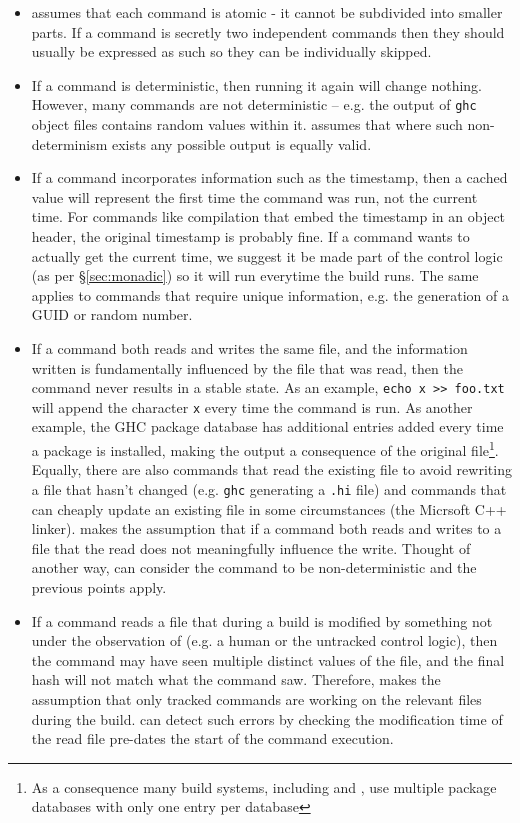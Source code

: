 \begin{itemize}
\item \Rattle assumes that each command is atomic - it cannot be subdivided into smaller parts. If a command is secretly two independent commands then they should usually be expressed as such so they can be individually skipped.

\item If a command is deterministic, then running it again will change nothing. However, many commands are not deterministic -- e.g. the output of \texttt{ghc} object files contains random values within it. \Rattle assumes that where such non-determinism exists any possible output is equally valid.

\item If a command incorporates information such as the timestamp, then a cached value will represent the first time the command was run, not the current time. For commands like compilation that embed the timestamp in an object header, the original timestamp is probably fine.  If a command wants to actually get the current time, we suggest it be made part of the control logic (as per \S\ref{sec:monadic}) so it will run everytime the build runs. The same applies to commands that require unique information, e.g. the generation of a GUID or random number.

\item If a command both reads and writes the same file, and the information written is fundamentally influenced by the file that was read, then the command never results in a stable state. As an example, \verb"echo x >> foo.txt" will append the character \texttt{x} every time the command is run. As another example, the GHC package database has additional entries added every time a package is installed, making the output a consequence of the original file\footnote{As a consequence many build systems, including \Bazel and \Rattle, use multiple package databases with only one entry per database}. Equally, there are also commands that read the existing file to avoid rewriting a file that hasn't changed (e.g. \texttt{ghc} generating a \texttt{.hi} file) and commands that can cheaply update an existing file in some circumstances (the Micrsoft C++ linker). \Rattle makes the assumption that if a command both reads and writes to a file that the read does not meaningfully influence the write. Thought of another way, \Rattle can consider the command to be non-deterministic and the previous points apply.

\item If a command reads a file that during a build is modified by something not under the observation of \Rattle (e.g. a human or the untracked control logic), then the command may have seen multiple distinct values of the file, and the final hash will not match what the command saw. Therefore, \Rattle makes the assumption that only \Rattle tracked commands are working on the relevant files during the build. \Rattle can detect such errors by checking the modification time of the read file pre-dates the start of the command execution.
\end{itemize}

